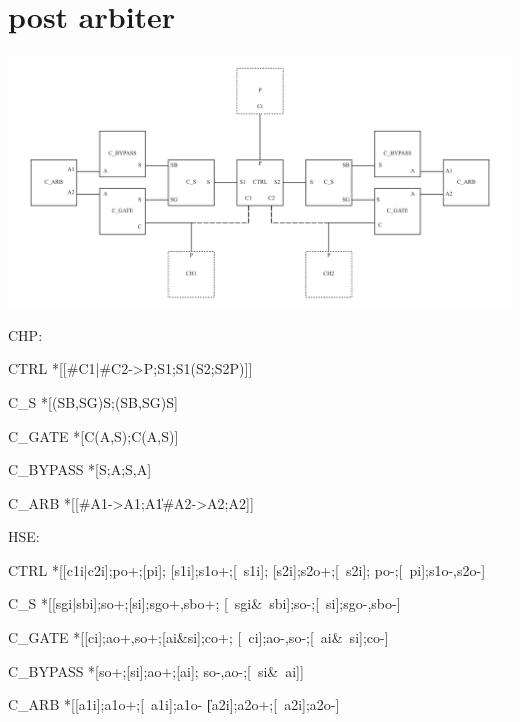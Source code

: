\documentclass{article}
\begin{document}




\section{post arbiter}

\includegraphics[width=\textwidth]{img/transmitter/arb.pdf}

\noindent CHP:

\begin{csp}
CTRL\equiv
  *[[#{C1}|#{C2}->P;S1;S1\star(S2;S2\star\!P)]]
\end{csp}
\begin{csp}
C_S\equiv
  *[(SB,SG)\star\!S;(SB,SG)\star\!S]
\end{csp}
\begin{csp}  
C_GATE\equiv
  *[C\star(A,S);C\star(A,S)]
\end{csp}
\begin{csp}
C_BYPASS\equiv
  *[S;A;S,A]
\end{csp}
\begin{csp}
C_ARB\equiv
  *[[#{A1}->A1;A1\|#{A2}->A2;A2]]
\end{csp}

\noindent HSE:

\begin{hse}
CTRL\equiv
  *[[c1i|c2i];po+;[pi];
    [s1i];s1o+;[~s1i];
    [s2i];s2o+;[~s2i];
    po-;[~pi];s1o-,s2o-]
\end{hse}
\begin{hse}
C_S\equiv
  *[[sgi|sbi];so+;[si];sgo+,sbo+;
    [~sgi&~sbi];so-;[~si];sgo-,sbo-]
\end{hse}
\begin{hse}
C_GATE\equiv    
  *[[ci];ao+,so+;[ai&si];co+;
    [~ci];ao-,so-;[~ai&~si];co-]
\end{hse}
\begin{hse}
C_BYPASS\equiv
  *[so+;[si];ao+;[ai];
    so-,ao-;[~si&~ai]]
\end{hse}
\begin{hse}
C_ARB\equiv
  *[[a1i];a1o+;[~a1i];a1o-
   \|[a2i];a2o+;[~a2i];a2o-]
\end{hse}
\end{document}
